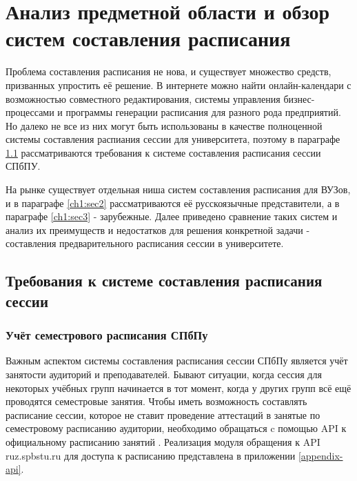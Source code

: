 \chapter{Анализ предметной области и обзор систем составления расписания} \label{ch1}


Проблема составления расписания не нова, и существует множество средств, призванных упростить её решение. В интернете можно найти онлайн-календари с возможностью совместного редактирования, системы управления бизнес-процессами и программы генерации расписания для разного рода предприятий. Но далеко не все из них могут быть использованы в качестве полноценной системы составления распиания сессии для университета, поэтому в параграфе \ref{ch1:sec1} рассматриваются требования к системе составления расписания сессии СПбПУ.

 На рынке существует отдельная ниша систем составления расписания для ВУЗов, и в параграфе \ref{ch1:sec2} рассматриваются её русскоязычные представители, а в параграфе \ref{ch1:sec3} - зарубежные. Далее приведено сравнение таких систем и анализ их преимуществ и недостатков для решения конкретной задачи - составления предварительного расписания сессии в университете.

\section{Требования к системе составления расписания сессии} \label{ch1:sec1}

\subsection{Учёт семестрового расписания СПбПу}

Важным аспектом системы составления расписания сессии СПбПу является учёт занятости аудиторий и преподавателей. Бывают ситуации, когда сессия для некоторых учёбных групп начинается в тот момент, когда у других групп всё ещё проводятся семестровые занятия. Чтобы иметь возможность составлять расписание сессии, которое не ставит проведение аттестаций в занятые по семестровому расписанию аудитории, необходимо обращаться c помощью API к официальному расписанию занятий  \cite{ruz}. 
Реализация модуля обращения к API ruz.spbstu.ru для доступа к расписанию представлена в приложении \ref{appendix-api}.

